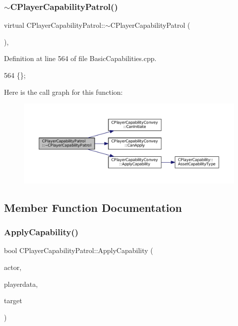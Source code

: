 \subsubsection{\texorpdfstring{$\sim$\+C\+Player\+Capability\+Patrol()}{~CPlayerCapabilityPatrol()}}
{\footnotesize\ttfamily virtual C\+Player\+Capability\+Patrol\+::$\sim$\+C\+Player\+Capability\+Patrol (\begin{DoxyParamCaption}{ }\end{DoxyParamCaption})\hspace{0.3cm}{\ttfamily [inline]}, {\ttfamily [virtual]}}



Definition at line 564 of file Basic\+Capabilities.\+cpp.


\begin{DoxyCode}
564 \{\};
\end{DoxyCode}
Here is the call graph for this function\+:
\nopagebreak
\begin{figure}[H]
\begin{center}
\leavevmode
\includegraphics[width=350pt]{classCPlayerCapabilityPatrol_a1f27cf43aabf3360d5db92fd23b55c01_cgraph}
\end{center}
\end{figure}


\subsection{Member Function Documentation}
\hypertarget{classCPlayerCapabilityPatrol_a6b9e361d99e256efadcd99a829f93f51}{}\label{classCPlayerCapabilityPatrol_a6b9e361d99e256efadcd99a829f93f51} 
\subsubsection{\texorpdfstring{Apply\+Capability()}{ApplyCapability()}}
{\footnotesize\ttfamily bool C\+Player\+Capability\+Patrol\+::\+Apply\+Capability (\begin{DoxyParamCaption}\item[{std\+::shared\+\_\+ptr$<$ \hyperlink{classCPlayerAsset}{C\+Player\+Asset} $>$}]{actor,  }\item[{std\+::shared\+\_\+ptr$<$ \hyperlink{classCPlayerData}{C\+Player\+Data} $>$}]{playerdata,  }\item[{std\+::shared\+\_\+ptr$<$ \hyperlink{classCPlayerAsset}{C\+Player\+Asset} $>$}]{target }\end{DoxyParamCaption})\hspace{0.3cm}{\ttfamily [virtual]}}



